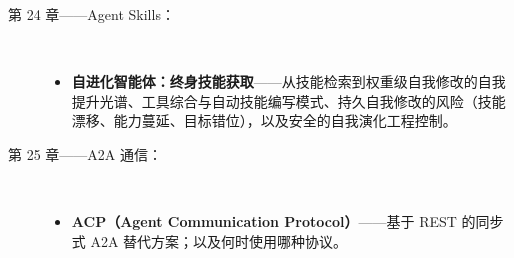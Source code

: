 \documentclass[11pt,a4paper,openany]{book}
\begin{document}
\begin{description}
  \item[第 24 章——Agent Skills：]~
    \begin{itemize}
      \item \textbf{自进化智能体：终身技能获取}——从技能检索到权重级自我修改的自我提升光谱、工具综合与自动技能编写模式、持久自我修改的风险（技能漂移、能力蔓延、目标错位），以及安全的自我演化工程控制。
    \end{itemize}

  \item[第 25 章——A2A 通信：]~
    \begin{itemize}
      \item \textbf{ACP（Agent Communication Protocol）}——基于 REST 的同步式 A2A 替代方案；以及何时使用哪种协议。
    \end{itemize}


\end{description}
\end{document}

